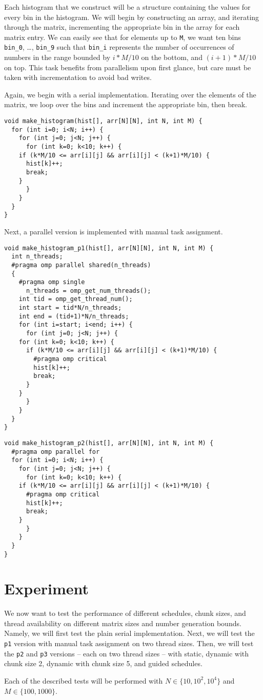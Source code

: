 \documentclass[11pt]{article}
\begin{document}
Each histogram that we construct will be a structure containing the
values for every bin in the histogram. We will begin by constructing
an array, and iterating through the matrix, incrementing the
appropriate bin in the array for each matrix entry. We can easily see
that for elements up to \verb~M~, we want ten bins \verb~bin_0~, \ldots{}, \verb~bin_9~
such that \verb~bin_i~ represents the number of occurrences of numbers in
the range bounded by $i*M/10$ on the bottom, and $(i+1)*M/10$ on
top. This task benefits from parallelism upon first glance, but care
must be taken with incrementation to avoid bad writes.

Again, we begin with a serial implementation. Iterating over the
elements of the matrix, we loop over the bins and increment the
appropriate bin, then break.

\begin{verbatim}
void make_histogram(hist[], arr[N][N], int N, int M) {
  for (int i=0; i<N; i++) {
    for (int j=0; j<N; j++) {
      for (int k=0; k<10; k++) {
	if (k*M/10 <= arr[i][j] && arr[i][j] < (k+1)*M/10) {
	  hist[k]++;
	  break;
	}
      }
    }
  }
}
\end{verbatim}

Next, a parallel version is implemented with manual task assignment.

\begin{verbatim}
void make_histogram_p1(hist[], arr[N][N], int N, int M) {
  int n_threads;
  #pragma omp parallel shared(n_threads)
  {
    #pragma omp single
      n_threads = omp_get_num_threads();
    int tid = omp_get_thread_num();
    int start = tid*N/n_threads;
    int end = (tid+1)*N/n_threads;
    for (int i=start; i<end; i++) {
      for (int j=0; j<N; j++) {
	for (int k=0; k<10; k++) {
	  if (k*M/10 <= arr[i][j] && arr[i][j] < (k+1)*M/10) {
	    #pragma omp critical
	    hist[k]++;
	    break;
	  }
	}
      }
    }
  }
}
\end{verbatim}

\begin{verbatim}
void make_histogram_p2(hist[], arr[N][N], int N, int M) {
  #pragma omp parallel for
  for (int i=0; i<N; i++) {
    for (int j=0; j<N; j++) {
      for (int k=0; k<10; k++) {
	if (k*M/10 <= arr[i][j] && arr[i][j] < (k+1)*M/10) {
	  #pragma omp critical
	  hist[k]++;
	  break;
	}
      }
    }
  }
}
\end{verbatim}

\section{Experiment}
\label{sec-4}

We now want to test the performance of different schedules, chunk
sizes, and thread availability on different matrix sizes and number
generation bounds. Namely, we will first test the plain serial
implementation. Next, we will test the \verb~p1~ version with manual task
assignment on two thread sizes. Then, we will test the \verb~p2~ and \verb~p3~
versions -- each on two thread sizes -- with static, dynamic with
chunk size 2, dynamic with chunk size 5, and guided schedules.

Each of the described tests will be performed with $N \in \{10, 10^2,
10^4\}$ and $M \in \{100, 1000\}$.
\end{document}
